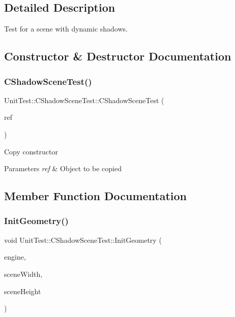 \subsection{Detailed Description}
Test for a scene with dynamic shadows. 

\subsection{Constructor \& Destructor Documentation}
\mbox{\label{class_unit_test_1_1_c_shadow_scene_test_a3bf2724745aa4037cc80a8d3b770bb07}} 
\subsubsection{\texorpdfstring{CShadowSceneTest()}{CShadowSceneTest()}}
{\footnotesize\ttfamily Unit\+Test\+::\+C\+Shadow\+Scene\+Test\+::\+C\+Shadow\+Scene\+Test (\begin{DoxyParamCaption}\item[{const \mbox{\hyperlink{class_unit_test_1_1_c_shadow_scene_test}{C\+Shadow\+Scene\+Test}} \&}]{ref }\end{DoxyParamCaption})\hspace{0.3cm}{\ttfamily [inline]}}

Copy constructor 
\begin{DoxyParams}{Parameters}
{\em ref} & Object to be copied \\
\hline
\end{DoxyParams}


\subsection{Member Function Documentation}
\mbox{\label{class_unit_test_1_1_c_shadow_scene_test_a39155841ac304757b41950c00cf712c7}} 
\subsubsection{\texorpdfstring{InitGeometry()}{InitGeometry()}}
{\footnotesize\ttfamily void Unit\+Test\+::\+C\+Shadow\+Scene\+Test\+::\+Init\+Geometry (\begin{DoxyParamCaption}\item[{\mbox{\hyperlink{class_geometry_engine_1_1_geometry_engine}{Geometry\+Engine\+::\+Geometry\+Engine}} $\ast$}]{engine,  }\item[{int}]{scene\+Width,  }\item[{int}]{scene\+Height }\end{DoxyParamCaption})\hspace{0.3cm}{\ttfamily [virtual]}}

